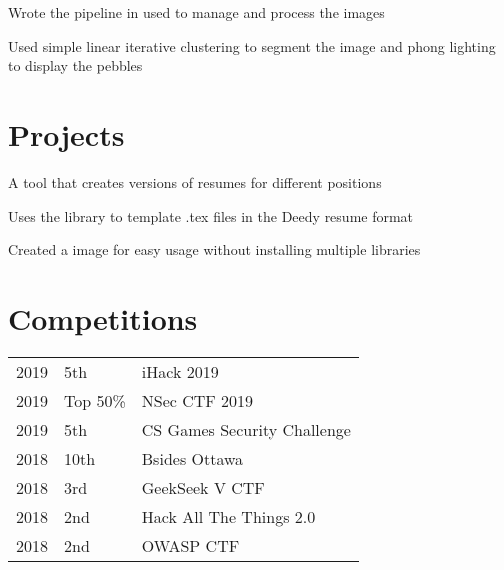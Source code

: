 \documentclass[]{deedy-resume-openfont}
\begin{document}
\begin{minipage}[t]{0.66\textwidth}
\begin{tightemize}
\item Wrote the pipeline in used to manage and process the images

\item Used simple linear iterative clustering to segment the image and phong lighting to display the pebbles

\end{tightemize}
\sectionsep

\section{Projects}


\begin{tightemize}

\item A tool that creates versions of resumes for different positions

\item Uses the library to template .tex files in the Deedy resume format

\item Created a image for easy usage without installing multiple libraries

\end{tightemize}
\sectionsep

\section{Competitions}

\begin{tabular}{rll}

2019      & 5th & iHack 2019\\

2019      & Top 50\% & NSec CTF 2019\\

2019      & 5th & CS Games Security Challenge\\

2018      & 10th & Bsides Ottawa\\

2018	     & 3rd & GeekSeek V CTF\\

2018	     & 2nd & Hack All The Things 2.0\\

2018	     & 2nd & OWASP CTF\\


\end{tabular}
\end{minipage}
\end{document}
